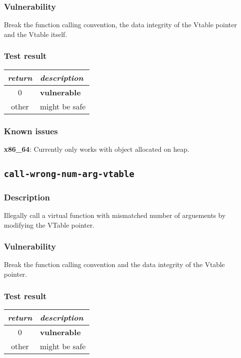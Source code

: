 \documentclass[a4paper]{book}
\begin{document}
\subsubsection{Vulnerability}
Break the function calling convention, the data integrity of the Vtable pointer and the Vtable itself.

\subsubsection{Test result}
\begin{tabular}{cl}
  \toprule
  \emph{return}  & \emph{description} \\
  \midrule
  0              & \textbf{vulnerable} \\
  other          & might be safe \\
  \bottomrule
\end{tabular}

\subsubsection{Known issues}

\textbf{x86\_64}: Currently only works with object allocated on heap.


\newpage
\subsection{\texttt{call-wrong-num-arg-vtable}}\label{test-call-wrong-num-arg-vtable}

\subsubsection{Description}
Illegally call a virtual function with mismatched number of arguements by modifying the VTable pointer.

\subsubsection{Vulnerability}
Break the function calling convention and the data integrity of the Vtable pointer.

\subsubsection{Test result}
\begin{tabular}{cl}
  \toprule
  \emph{return}  & \emph{description} \\
  \midrule
  0              & \textbf{vulnerable} \\
  other          & might be safe \\
  \bottomrule
\end{tabular}
\end{document}
